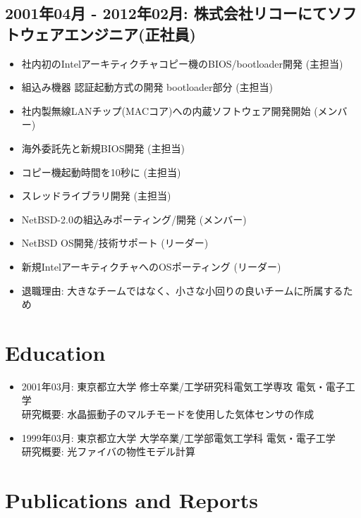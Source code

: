 \documentclass[letterpaper]{article}
\begin{document}
\subsection*{2001年04月 - 2012年02月: 株式会社リコーにてソフトウェアエンジニア(正社員)}

\begin{itemize}
  \item 社内初のIntelアーキティクチャコピー機のBIOS/bootloader開発 (主担当)
  \item 組込み機器 認証起動方式の開発 bootloader部分 (主担当)
  \item 社内製無線LANチップ(MACコア)への内蔵ソフトウェア開発開始 (メンバー)
  \item 海外委託先と新規BIOS開発 (主担当)
  \item コピー機起動時間を10秒に (主担当)
  \item スレッドライブラリ開発 (主担当)
  \item NetBSD-2.0の組込みポーティング/開発 (メンバー)
  \item NetBSD OS開発/技術サポート (リーダー)
  \item 新規IntelアーキティクチャへのOSポーティング (リーダー)
  \item 退職理由: 大きなチームではなく、小さな小回りの良いチームに所属するため
\end{itemize}

\section*{Education}

\begin{itemize}
  \item 2001年03月: 東京都立大学 修士卒業/工学研究科電気工学専攻 電気・電子工学 \\
    研究概要: 水晶振動子のマルチモードを使用した気体センサの作成
  \item 1999年03月: 東京都立大学 大学卒業/工学部電気工学科 電気・電子工学 \\
    研究概要: 光ファイバの物性モデル計算
\end{itemize}

\section*{Publications and Reports}
\end{document}
